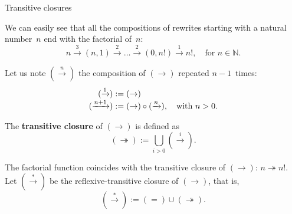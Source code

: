 %
\begin{frame}{Transitive closures}

  We can easily see that all the compositions of rewrites starting
  with a natural number~\(n\) end with the factorial of~\(n\):
  \smallskip
  \begin{equation*}
    n \xrightarrow{3} (n,1)
    \xrightarrow{2} \dots
    \xrightarrow{2} (0,n!)
    \xrightarrow{1}
    n!, \quad \text{for \(n \in \mathbb{N}\)}.
  \end{equation*}

  Let us note \((\xrightarrow{n})\) the composition of
  \((\rightarrow)\) repeated \(n-1\)~times:
  \begin{align*}
    (\xrightarrow{1})   &:= (\rightarrow)\\
    (\xrightarrow{\smash{n+1}}) & :=
    (\rightarrow) \circ (\xrightarrow{\smash{n}}),
    \quad\text{with \(n > 0\)}.
  \end{align*}

  The \textbf{transitive closure} of \((\rightarrow)\) is defined as
  \begin{equation*}
    (\twoheadrightarrow) := \bigcup_{i > 0}{(\xrightarrow{i})}.
  \end{equation*}

  The factorial function coincides with the transitive closure of
  \((\rightarrow)\): \(n \twoheadrightarrow n!\). Let
  \((\xrightarrow{*})\) be the reflexive\hyp{}transitive closure of
  \((\rightarrow)\), that is,
  \begin{equation*}
    (\xrightarrow{*}) := (=) \cup (\twoheadrightarrow).
  \end{equation*}

\end{frame}

